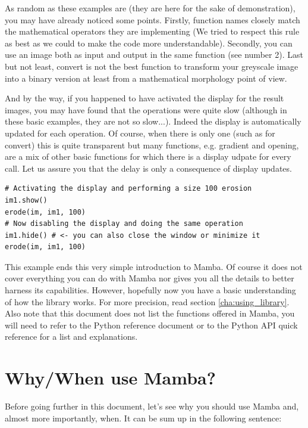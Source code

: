 \documentclass[a4paper,10pt,oneside]{article}
\begin{document}
As random as these examples are (they are here for the sake of demonstration),
you may have already noticed some points. Firstly, function names closely
match the mathematical operators they are implementing (We tried to respect this
rule as best as we could to make the code more understandable). Secondly, you can
use an image both as input and output in the same function (see number 2). Last
but not least, convert is not the best function to transform your greyscale image into
a binary version at least from a mathematical morphology point of view.

And by the way, if you happened to have activated the display for the result
images, you may have found that the operations were quite slow (although in these 
basic examples, they are not so slow...). Indeed the 
display is automatically updated for each operation. Of course, when there is
only one (such as for convert) this is quite transparent but many functions, 
e.g. gradient and opening, are a mix of other basic functions for which there is
a display udpate for every call. Let us assure you that the delay is only a
consequence of display updates.

\lstset{language=Python}
\begin{lstlisting}
# Activating the display and performing a size 100 erosion
im1.show()
erode(im, im1, 100)
# Now disabling the display and doing the same operation
im1.hide() # <- you can also close the window or minimize it
erode(im, im1, 100)
\end{lstlisting}

This example ends this very simple introduction to Mamba. Of course it does not
cover everything you can do with Mamba nor gives you all the details to better
harness its capabilities. However, hopefully now you have a basic understanding 
of how the library works. For more precision, read section \ref{cha:using_library}.
Also note that this document does not list the functions offered in Mamba, you
will need to refer to the Python reference document or to the Python API
quick reference for a list and explanations.

\pagebreak

\section{Why/When use Mamba?}

Before going further in this document, let's see why you should use Mamba and, 
almost more importantly, when. It can be sum up in the following sentence:
\end{document}
